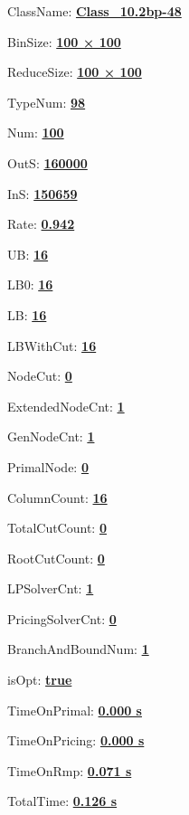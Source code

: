 \documentclass[11pt]{article}
\begin{document}
\pagestyle{empty}


ClassName: \underline{\textbf{Class_10.2bp-48}}
\par
BinSize: \underline{\textbf{100 × 100}}
\par
ReduceSize: \underline{\textbf{100 × 100}}
\par
TypeNum: \underline{\textbf{98}}
\par
Num: \underline{\textbf{100}}
\par
OutS: \underline{\textbf{160000}}
\par
InS: \underline{\textbf{150659}}
\par
Rate: \underline{\textbf{0.942}}
\par
UB: \underline{\textbf{16}}
\par
LB0: \underline{\textbf{16}}
\par
LB: \underline{\textbf{16}}
\par
LBWithCut: \underline{\textbf{16}}
\par
NodeCut: \underline{\textbf{0}}
\par
ExtendedNodeCnt: \underline{\textbf{1}}
\par
GenNodeCnt: \underline{\textbf{1}}
\par
PrimalNode: \underline{\textbf{0}}
\par
ColumnCount: \underline{\textbf{16}}
\par
TotalCutCount: \underline{\textbf{0}}
\par
RootCutCount: \underline{\textbf{0}}
\par
LPSolverCnt: \underline{\textbf{1}}
\par
PricingSolverCnt: \underline{\textbf{0}}
\par
BranchAndBoundNum: \underline{\textbf{1}}
\par
isOpt: \underline{\textbf{true}}
\par
TimeOnPrimal: \underline{\textbf{0.000 s}}
\par
TimeOnPricing: \underline{\textbf{0.000 s}}
\par
TimeOnRmp: \underline{\textbf{0.071 s}}
\par
TotalTime: \underline{\textbf{0.126 s}}
\par
\newpage


\end{document}
